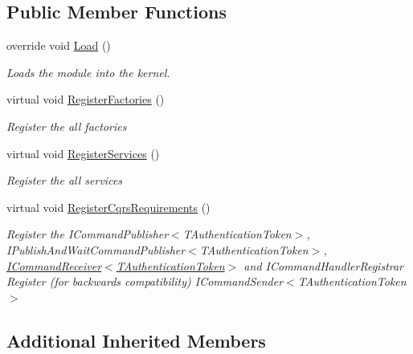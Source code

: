 \subsection*{Public Member Functions}
\begin{DoxyCompactItemize}
\item 
override void \hyperlink{classCqrs_1_1Ninject_1_1Configuration_1_1InProcessCommandBusModule_acf8794d693a38ff114038d6e3dfc961b_acf8794d693a38ff114038d6e3dfc961b}{Load} ()
\begin{DoxyCompactList}\small\item\em Loads the module into the kernel. \end{DoxyCompactList}\item 
virtual void \hyperlink{classCqrs_1_1Ninject_1_1Configuration_1_1InProcessCommandBusModule_a4591fb32f9ec60e3246a9864ab3288cd_a4591fb32f9ec60e3246a9864ab3288cd}{Register\+Factories} ()
\begin{DoxyCompactList}\small\item\em Register the all factories \end{DoxyCompactList}\item 
virtual void \hyperlink{classCqrs_1_1Ninject_1_1Configuration_1_1InProcessCommandBusModule_a292ec8a93f2d35a1b2053bc0b97aa7b2_a292ec8a93f2d35a1b2053bc0b97aa7b2}{Register\+Services} ()
\begin{DoxyCompactList}\small\item\em Register the all services \end{DoxyCompactList}\item 
virtual void \hyperlink{classCqrs_1_1Ninject_1_1Configuration_1_1InProcessCommandBusModule_aee43bfd0d686faa9944dd29305e1ad39_aee43bfd0d686faa9944dd29305e1ad39}{Register\+Cqrs\+Requirements} ()
\begin{DoxyCompactList}\small\item\em Register the I\+Command\+Publisher$<$\+T\+Authentication\+Token$>$, I\+Publish\+And\+Wait\+Command\+Publisher$<$\+T\+Authentication\+Token$>$, \hyperlink{interfaceCqrs_1_1Commands_1_1ICommandReceiver}{I\+Command\+Receiver$<$\+T\+Authentication\+Token$>$} and I\+Command\+Handler\+Registrar Register (for backwards compatibility) I\+Command\+Sender$<$\+T\+Authentication\+Token$>$ \end{DoxyCompactList}\end{DoxyCompactItemize}
\subsection*{Additional Inherited Members}


